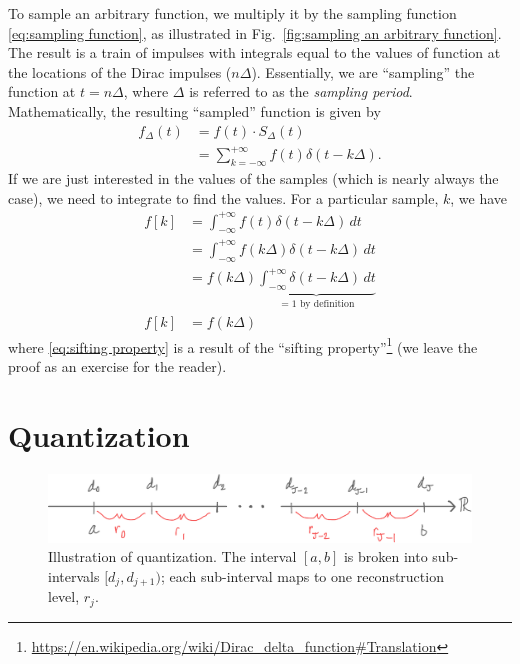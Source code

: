 \documentclass[11pt]{article}
\newcommand{\figref}[1]{Fig.~\ref{#1}}
\begin{document}
To sample an arbitrary function, we multiply it by the sampling function \eqref{eq:sampling function}, as illustrated in \figref{fig:sampling an arbitrary function}. The result is a train of impulses with integrals equal to the values of function at the locations of the Dirac impulses ($n\Delta$). Essentially, we are ``sampling'' the function at $t = n\Delta$, where $\Delta$ is referred to as the \emph{sampling period}.
Mathematically, the resulting ``sampled'' function is given by
\begin{align}
    f_\Delta(t) &= f(t) \cdot S_\Delta(t) \\
    &= \sum_{k=-\infty}^{+\infty} f(t) \delta(t - k\Delta).
\end{align}
If we are just interested in the values of the samples (which is nearly always the case), we need to integrate to find the values. For a particular sample, $k$, we have
\begin{align}
    f[k] &= \int_{-\infty}^{+\infty} f(t) \delta(t - k\Delta) \, dt \\
    &= \int_{-\infty}^{+\infty} f(k\Delta) \delta(t - k\Delta) \, dt \label{eq:sifting property}\\
    &= f(k\Delta) \underbrace{\int_{-\infty}^{+\infty} \delta(t - k\Delta) \, dt}_{= 1 \text{ by definition}} \\
    f[k] &= f(k\Delta)
\end{align}
where \eqref{eq:sifting property} is a result of the ``sifting property''\footnote{\href{https://en.wikipedia.org/wiki/Dirac_delta_function\#Translation}{https://en.wikipedia.org/wiki/Dirac\_delta\_function\#Translation}} (we leave the proof as an exercise for the reader).


\section{Quantization}

\begin{figure}
    \centering
    \includegraphics[width=\textwidth]{../figures/lecture01/quantization-ranges.pdf}
    \caption{Illustration of quantization. The interval $[a,b]$ is broken into sub-intervals $[d_j,d_{j+1})$; each sub-interval maps to one reconstruction level, $r_j$.}
    \label{fig:quantization ranges}
\end{figure}
\end{document}
